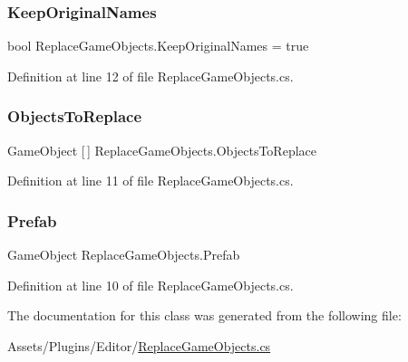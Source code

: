 \subsubsection{\texorpdfstring{Keep\+Original\+Names}{KeepOriginalNames}}
{\footnotesize\ttfamily bool Replace\+Game\+Objects.\+Keep\+Original\+Names = true}



Definition at line 12 of file Replace\+Game\+Objects.\+cs.

\mbox{\label{class_replace_game_objects_a6a8b17b8c4a7e533fe9c1b1f818853d6}} 
\subsubsection{\texorpdfstring{Objects\+To\+Replace}{ObjectsToReplace}}
{\footnotesize\ttfamily Game\+Object \mbox{[}$\,$\mbox{]} Replace\+Game\+Objects.\+Objects\+To\+Replace}



Definition at line 11 of file Replace\+Game\+Objects.\+cs.

\mbox{\label{class_replace_game_objects_adcc6aa39ef9bdc7bc86754337b308f41}} 
\subsubsection{\texorpdfstring{Prefab}{Prefab}}
{\footnotesize\ttfamily Game\+Object Replace\+Game\+Objects.\+Prefab}



Definition at line 10 of file Replace\+Game\+Objects.\+cs.



The documentation for this class was generated from the following file\+:\begin{DoxyCompactItemize}
\item 
Assets/\+Plugins/\+Editor/\mbox{\hyperlink{_replace_game_objects_8cs}{Replace\+Game\+Objects.\+cs}}\end{DoxyCompactItemize}
